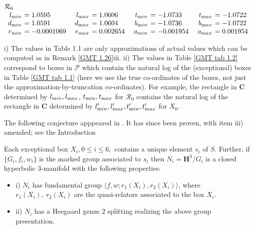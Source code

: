\begin{remark}
\begin{table}
\begin{small}
$$\begin{array}{rlrlrlrl}
\noalign{\noindent  ${\mathcal R}_6$}
\noalign{\vskip2pt}
l_{\textrm min} &\hskip-6pt =  1.0595&\enspace    l_{\textrm max} &\hskip-6pt =  1.0606&\enspace   
t_{\textrm min} &\hskip-6pt =  -1.0733&\enspace    t_{\textrm max} &\hskip-6pt =  -1.0722\\
d_{\textrm min} &\hskip-6pt =  1.0591&  d_{\textrm max}
&\hskip-6pt =  1.0604&   b_{\textrm min} &\hskip-6pt =  -1.0736&  b_{\textrm max} &\hskip-6pt =  -1.0722\\
r_{\textrm min} &\hskip-6pt =  -0.0001069& 
r_{\textrm max} &\hskip-6pt =  0.002654&   a_{\textrm min} &\hskip-6pt =  -0.001954&  a_{\textrm max} &\hskip-6pt =  0.001954\end{array}$$
\end{small}
\end{table}

\begin{remarks}\label{GMT 1.30}
i)  The values in Table 1.1 are only 
	approximations of actual values which can be computed as in Remark \ref{GMT 1.26}iii.
	ii)  The values in Table \ref{GMT tab 1.2} correspond to boxes in ${\mathcal P}$ which contain the natural log of the (exceptional) boxes in Table \ref{GMT tab 1.1} (here we use the true co-ordinates of the boxes, not just the approximation-by-truncation co-ordinates).  
For example,
 the rectangle in ${\mathbf C}$ determined by $l_{\textrm min}, l_{\textrm max}$,
$t_{\textrm min}, t_{\textrm max}$ for ${\mathcal R}_0$ contains the natural log of the rectangle in ${\mathbf C}$ determined by $l'_{\textrm min},
l'_{\textrm max}, t'_{\textrm min}, t'_{\textrm max}$ for $X_0$.  
\end{remarks}

The following conjecture apppeared in \cite{GMT}. It has since been proven,
with item iii) amended; see
the Introduction %

\begin{conjecture}\label{GMT 1.31}
Each  exceptional 
box $X_i, 0\le i\le 6,$ contains a unique element $s_i$ of $S.$
Further{\textrm ,} if $\{G_i, f_i, w_i\}$ is the marked group
associated to $s_i$ then
$N_i = {\mathbf H}^3/G_i$ is a closed hyperbolic $3$\/{\textrm -}\/manifold
with the following properties\/{\textrm :}
\begin{itemize}
\item{i)} $N_i$ has fundamental group
$\langle f,w;r_1(X_i),r_2(X_i)\rangle${\textrm ,}
where $r_1(X_i),\ r_2(X_i)$ are the quasi\/{\textrm -}\/relators
associated to the box $X_i.$
\item{ii)}  $N_i$ has a Heegaard genus $2$ splitting realizing the above group presentation.


\end{itemize}
\end{conjecture}
\end{remark}
